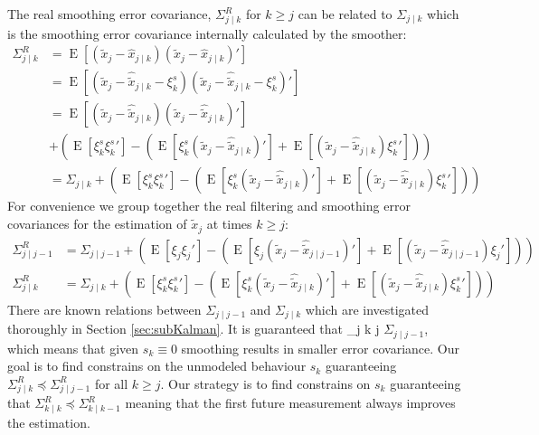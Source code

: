 \documentclass[oneside,12pt]{article}
\begin{document}
%
The real smoothing error covariance, $\Sigma^R_{j \mid k}$ for $k \geq j$ can be related to $\Sigma_{j \mid k}$ which is the smoothing error covariance internally calculated by the smoother:
%
\begin{equation}\label{eq:smoothingErrCov_linSplit}
    \begin{split}
        \Sigma^R_{j \mid k} &= \operatorname{E}[(\tilde{x}_{j}-\hat{x}_{j \mid k})(\tilde{x}_{j}-\hat{x}_{j \mid k})']\\
        &= \operatorname{E}[(\tilde{x}_{j} - \hat{\tilde{x}}_{j \mid k} - \xi_k^s)(\tilde{x}_{j} - \hat{\tilde{x}}_{j \mid k} - \xi_k^s)']\\
        &= \operatorname{E}[(\tilde{x}_{j}- \hat{\tilde{x}}_{j \mid k})(\tilde{x}_{j}- \hat{\tilde{x}}_{j \mid k})']\\
        &+ \left(\operatorname{E}[\xi^s_{k}\xi^s_{k}'] - \left( \operatorname{E}[\xi^s_{k}(\tilde{x}_{j}- \hat{\tilde{x}}_{j \mid k})'] +  \operatorname{E}[(\tilde{x}_{j} - \hat{\tilde{x}}_{j \mid k})\xi^s_{k}'] \right) \right)\\
        &= \Sigma_{j \mid k} + \left(\operatorname{E}[\xi^s_{k}\xi^s_{k}'] - \left( \operatorname{E}[\xi^s_{k}(\tilde{x}_{j}- \hat{\tilde{x}}_{j \mid k})'] +  \operatorname{E}[(\tilde{x}_{j} - \hat{\tilde{x}}_{j \mid k})\xi^s_{k}'] \right) \right)
    \end{split}
\end{equation}         
%
For convenience we group together the real filtering and smoothing error covariances for the estimation of $\tilde{x}_j$ at times $k \geq j$:
%
\begin{equation}\label{eq:filteringSmoothingErrCovs}
    \begin{split}
        \Sigma^R_{j \mid j-1} &= \Sigma_{j \mid j-1} + \left(\operatorname{E}[\xi_{j}\xi_{j}'] - \left( \operatorname{E}[\xi_{j}(\tilde{x}_{j}- \hat{\tilde{x}}_{j \mid j-1})'] +  \operatorname{E}[(\tilde{x}_{j}- \hat{\tilde{x}}_{j \mid j-1})\xi_{j}'] \right) \right)\\
        \Sigma^R_{j \mid k} &= \Sigma_{j \mid k} + \left(\operatorname{E}[\xi^s_{k}\xi^s_{k}'] - \left( \operatorname{E}[\xi^s_{k}(\tilde{x}_{j}- \hat{\tilde{x}}_{j \mid k})'] +  \operatorname{E}[(\tilde{x}_{j} - \hat{\tilde{x}}_{j \mid k})\xi^s_{k}'] \right) \right)
    \end{split}
\end{equation}  
%
There are known relations between $\Sigma_{j \mid j-1}$ and $\Sigma_{j \mid k}$ which are investigated thoroughly in Section \ref{sec:subKalman}. It is guaranteed that \Sigma_{j \mid k \geq j} \preceq $\Sigma_{j \mid j-1}$, which means that given $s_k \equiv 0$ smoothing results in smaller error covariance. Our goal is to find constrains on the unmodeled behaviour $s_k$ guaranteeing $\Sigma^R_{j \mid k} \preceq \Sigma^R_{j \mid j-1}$ for all $k \geq j$. Our strategy is to find constrains on $s_k$ guaranteeing that $\Sigma^R_{k \mid k} \preceq \Sigma^R_{k \mid k-1}$ meaning that the first future measurement always improves the estimation.\\\\
\end{document}
